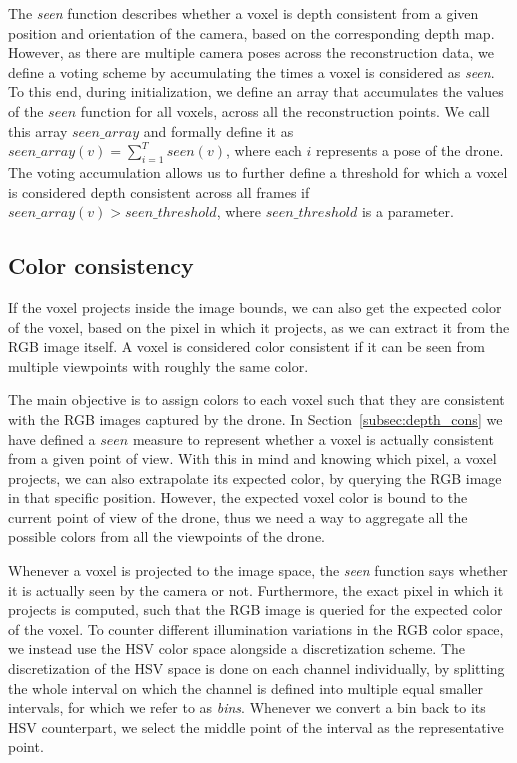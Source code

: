 \documentclass{article}
\begin{document}
The \textit{seen} function describes whether a voxel is depth consistent from a given position and orientation of the camera, based on the corresponding depth map. However, as there are multiple camera poses across the reconstruction data, we define a voting scheme by accumulating the times a voxel is considered as \textit{seen}. To this end, during initialization, we define an array that accumulates the values of the \(seen\) function for all voxels, across all the reconstruction points. We call this array \(seen\_array\) and formally define it as %
$seen\_array(v) = \sum_{i=1}^{T}seen(v)$, where each \(i\) represents a pose of the drone. The voting accumulation allows us to further define a threshold for which a voxel is considered depth consistent across all frames if \(seen\_array(v) > seen\_threshold\), where \(seen\_threshold\) is a parameter. 



\subsection{Color consistency} \label{subsec:color_cons}

If the voxel projects inside the image bounds, we can also get the expected color of the voxel, based on the pixel in which it projects, as we can extract it from the RGB image itself. A voxel is considered color consistent if it can be seen from multiple viewpoints with roughly the same color.

The main objective is to assign colors to each voxel such that they are consistent with the RGB images captured by the drone. In Section~\ref{subsec:depth_cons} we have defined a \(seen\) measure to represent whether a voxel is actually consistent from a given point of view. With this in mind and knowing which pixel, a voxel projects, we can also extrapolate its expected color, by querying the RGB image in that specific position. However, the expected voxel color is bound to the current point of view of the drone, thus we need a way to aggregate all the possible colors from all the viewpoints of the drone.  

Whenever a voxel is projected to the image space, the \textit{seen} function says whether it is actually seen by the camera or not. Furthermore, the exact pixel in which it projects is computed, such that the RGB image is queried for the expected color of the voxel. To counter different illumination variations in the RGB color space, we instead use the HSV color space alongside a discretization scheme. The discretization of the HSV space is done on each channel individually, by splitting the whole interval on which the channel is defined into multiple equal smaller intervals, for which we refer to as \textit{bins}. Whenever we convert a bin back to its HSV counterpart, we select the middle point of the interval as the representative point.
\end{document}
